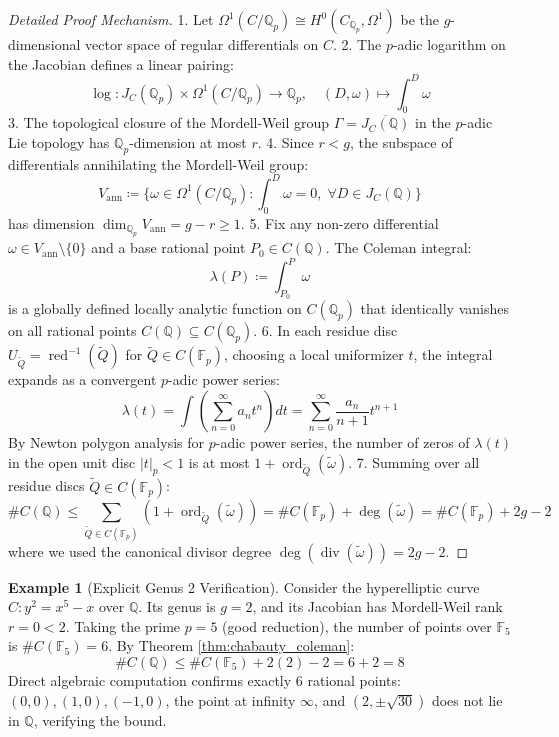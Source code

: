 \documentclass[11pt,a4paper]{article}
\theoremstyle{definition}
\newtheorem{example}[theorem]{Example}
\begin{document}
\begin{proof}[Detailed Proof Mechanism]
1. Let $\Omega^1(C/\mathbb{Q}_p) \cong H^0(C_{\mathbb{Q}_p}, \Omega^1)$ be the $g$-dimensional vector space of regular differentials on $C$.
2. The $p$-adic logarithm on the Jacobian defines a linear pairing:
\[ \log: J_C(\mathbb{Q}_p) \times \Omega^1(C/\mathbb{Q}_p) \to \mathbb{Q}_p, \quad (D, \omega) \mapsto \int_0^D \omega \]
3. The topological closure of the Mordell-Weil group $\Gamma = \overline{J_C(\mathbb{Q})}$ in the $p$-adic Lie topology has $\mathbb{Q}_p$-dimension at most $r$.
4. Since $r < g$, the subspace of differentials annihilating the Mordell-Weil group:
\[ V_{\text{ann}} \coloneqq \{ \omega \in \Omega^1(C/\mathbb{Q}_p) : \int_0^D \omega = 0, \; \forall D \in J_C(\mathbb{Q}) \} \]
has dimension $\dim_{\mathbb{Q}_p} V_{\text{ann}} = g - r \ge 1$.
5. Fix any non-zero differential $\omega \in V_{\text{ann}} \setminus \{0\}$ and a base rational point $P_0 \in C(\mathbb{Q})$. The Coleman integral:
\[ \lambda(P) \coloneqq \int_{P_0}^P \omega \]
is a globally defined locally analytic function on $C(\mathbb{Q}_p)$ that identically vanishes on all rational points $C(\mathbb{Q}) \subseteq C(\mathbb{Q}_p)$.
6. In each residue disc $U_{\tilde{Q}} = \operatorname{red}^{-1}(\tilde{Q})$ for $\tilde{Q} \in C(\mathbb{F}_p)$, choosing a local uniformizer $t$, the integral expands as a convergent $p$-adic power series:
\[ \lambda(t) = \int \left( \sum_{n=0}^\infty a_n t^n \right) dt = \sum_{n=0}^\infty \frac{a_n}{n+1} t^{n+1} \]
By Newton polygon analysis for $p$-adic power series, the number of zeros of $\lambda(t)$ in the open unit disc $|t|_p < 1$ is at most $1 + \operatorname{ord}_{\tilde{Q}}(\tilde{\omega})$.
7. Summing over all residue discs $\tilde{Q} \in C(\mathbb{F}_p)$:
\[ \# C(\mathbb{Q}) \le \sum_{\tilde{Q} \in C(\mathbb{F}_p)} (1 + \operatorname{ord}_{\tilde{Q}}(\tilde{\omega})) = \# C(\mathbb{F}_p) + \deg(\tilde{\omega}) = \# C(\mathbb{F}_p) + 2g - 2 \]
where we used the canonical divisor degree $\deg(\operatorname{div}(\tilde{\omega})) = 2g - 2$.
\end{proof}

\begin{example}[Explicit Genus 2 Verification]\label{ex:genus2}
Consider the hyperelliptic curve $C: y^2 = x^5 - x$ over $\mathbb{Q}$.
Its genus is $g = 2$, and its Jacobian has Mordell-Weil rank $r = 0 < 2$.
Taking the prime $p = 5$ (good reduction), the number of points over $\mathbb{F}_5$ is $\# C(\mathbb{F}_5) = 6$.
By Theorem \ref{thm:chabauty_coleman}:
\[ \# C(\mathbb{Q}) \le \# C(\mathbb{F}_5) + 2(2) - 2 = 6 + 2 = 8 \]
Direct algebraic computation confirms exactly 6 rational points: $(0, 0), (1, 0), (-1, 0)$, the point at infinity $\infty$, and $(2, \pm \sqrt{30})$ does not lie in $\mathbb{Q}$, verifying the bound.
\end{example}
\end{document}
